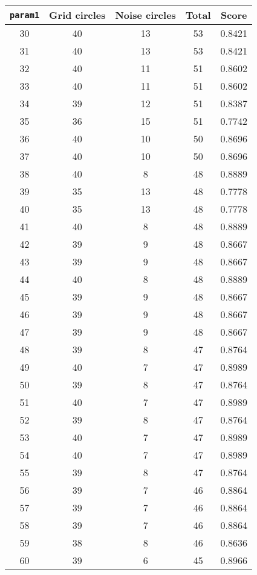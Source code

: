 \documentclass[letterpaper, 12pt]{article}
\begin{document}
\begin{longtable}{|c|c|c|c|c|}
\hline
\textbf{\texttt{param1}} & \textbf{Grid circles} & \textbf{Noise circles} & \textbf{Total} & \textbf{Score} \\
\hline
30 & 40 & 13 & 53 & 0.8421 \\
\hline
31 & 40 & 13 & 53 & 0.8421 \\
\hline
32 & 40 & 11 & 51 & 0.8602 \\
\hline
33 & 40 & 11 & 51 & 0.8602 \\
\hline
34 & 39 & 12 & 51 & 0.8387 \\
\hline
35 & 36 & 15 & 51 & 0.7742 \\
\hline
36 & 40 & 10 & 50 & 0.8696 \\
\hline
37 & 40 & 10 & 50 & 0.8696 \\
\hline
38 & 40 & 8 & 48 & 0.8889 \\
\hline
39 & 35 & 13 & 48 & 0.7778 \\
\hline
40 & 35 & 13 & 48 & 0.7778 \\
\hline
41 & 40 & 8 & 48 & 0.8889 \\
\hline
42 & 39 & 9 & 48 & 0.8667 \\
\hline
43 & 39 & 9 & 48 & 0.8667 \\
\hline
44 & 40 & 8 & 48 & 0.8889 \\
\hline
45 & 39 & 9 & 48 & 0.8667 \\
\hline
46 & 39 & 9 & 48 & 0.8667 \\
\hline
47 & 39 & 9 & 48 & 0.8667 \\
\hline
48 & 39 & 8 & 47 & 0.8764 \\
\hline
49 & 40 & 7 & 47 & 0.8989 \\
\hline
50 & 39 & 8 & 47 & 0.8764 \\
\hline
51 & 40 & 7 & 47 & 0.8989 \\
\hline
52 & 39 & 8 & 47 & 0.8764 \\
\hline
53 & 40 & 7 & 47 & 0.8989 \\
\hline
54 & 40 & 7 & 47 & 0.8989 \\
\hline
55 & 39 & 8 & 47 & 0.8764 \\
\hline
56 & 39 & 7 & 46 & 0.8864 \\
\hline
57 & 39 & 7 & 46 & 0.8864 \\
\hline
58 & 39 & 7 & 46 & 0.8864 \\
\hline
59 & 38 & 8 & 46 & 0.8636 \\
\hline
60 & 39 & 6 & 45 & 0.8966 \\
\hline

\end{longtable}
\end{document}
